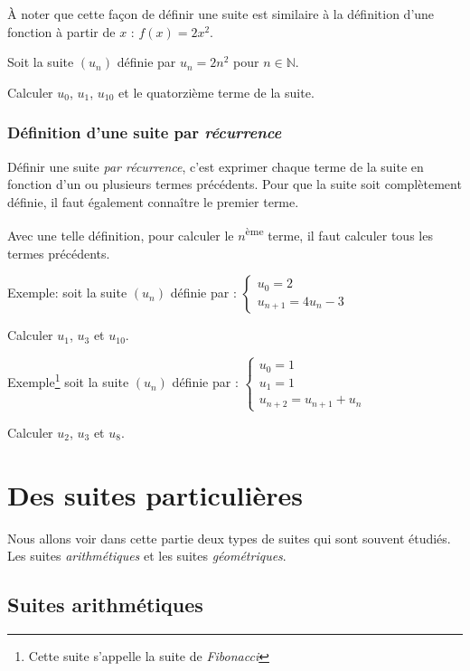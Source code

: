 \documentclass[a4paper,12pt]{scrartcl}
\begin{document}
À noter que cette façon de définir une suite est similaire à la définition d'une fonction à partir de $x$ : $f(x) = 2x^{2}$.

Soit la suite $\left( u_n \right)$ définie par $u_n = 2n^{2}$ pour $n \in \mathbb{N}$.

Calculer $u_0$, $u_1$, $u_{10}$ et le quatorzième terme de la suite.


\subsubsection{Définition d'une suite par \emph{récurrence}}

Définir une suite \emph{par récurrence}, c'est exprimer chaque terme de la suite en fonction d'un ou plusieurs termes précédents. Pour que la suite soit complètement définie, il faut également connaître le premier terme.

Avec une telle définition, pour calculer le $n$\textsuperscript{ème} terme, il faut calculer tous les termes précédents.

Exemple: soit la suite $\left( u_n \right)$ définie par : 
$\begin{cases}
u_0 = 2\\
u_{n+1} = 4 u_n - 3
\end{cases}$

Calculer $u_1$, $u_3$ et $u_{10}$.


Exemple\footnote{Cette suite s'appelle la suite de \emph{Fibonacci}} soit la suite $\left( u_n \right)$ définie par : 
$\begin{cases}
u_0 = 1\\
u_1 = 1\\
u_{n+2} = u_{n+1} + u_{n}
\end{cases}$

Calculer $u_2$, $u_3$ et $u_{8}$.


\section{Des suites particulières}

Nous allons voir dans cette partie deux types de suites qui sont souvent étudiés. Les suites \emph{arithmétiques} et les suites \emph{géométriques}.

\subsection{Suites arithmétiques}
\end{document}
